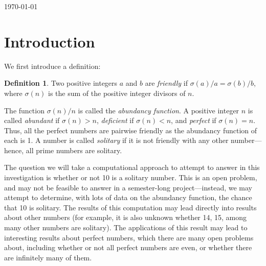 \documentclass[11pt]{article}
\theoremstyle{definition}
\newtheorem{dfn}{Definition}[section]
\begin{document}
\begin{titlepage}
{\large \today}\\[3cm] 


 

\vfill 

\end{titlepage}

\tableofcontents
\newpage
\newpage

\section{Introduction}

We first introduce a definition:

\begin{dfn}
Two positive integers $a$ and $b$ are \textit{friendly} if $\sigma(a)/a = \sigma(b)/b$, where $\sigma(n)$ is the sum of the positive integer divisors of $n$.
\end{dfn}

The function $\sigma(n)/n$ is called the \textit{abundancy function}. A positive integer $n$ is called \textit{abundant} if $\sigma(n) > n$, \textit{deficient} if $\sigma(n) < n$, and \textit{perfect} if $\sigma(n) = n$. Thus, all the perfect numbers are pairwise friendly as the abundancy function of each is 1. A number is called \textit{solitary} if it is not friendly with any other number---hence, all prime numbers are solitary.

The question we will take a computational approach to attempt to answer in this investigation is whether or not 10 is a solitary number. This is an open problem, and may not be feasible to answer in a semester-long project---instead, we may attempt to determine, with lots of data on the abundancy function, the chance that 10 is solitary. The results of this computation may lead directly into results about other numbers (for example, it is also unknown whether 14, 15, among many other numbers are solitary). The applications of this result may lead to interesting results about perfect numbers, which there are many open problems about, including whether or not all perfect numbers are even, or whether there are infinitely many of them.
\end{document}
